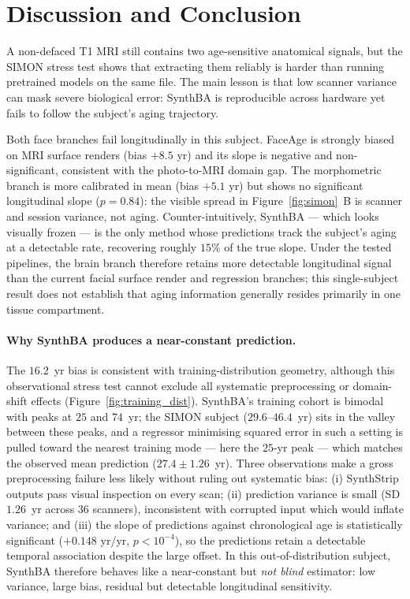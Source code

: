 \documentclass[11pt]{article}
\begin{document}
\section{Discussion and Conclusion}

A non-defaced T1 MRI still contains two age-sensitive anatomical signals,
but the SIMON stress test shows that extracting them reliably is harder than
running pretrained models on the same file.  The main lesson is that low
scanner variance can mask severe biological error: SynthBA is reproducible
across hardware yet fails to follow the subject's aging trajectory.

Both face branches fail longitudinally in this subject.  FaceAge is
strongly biased on MRI surface renders (bias $+8.5$ yr) and its slope is
negative and non-significant, consistent with the photo-to-MRI domain
gap.  The morphometric branch is more calibrated in mean (bias $+5.1$
yr) but shows no significant longitudinal slope ($p{=}0.84$): the
visible spread in Figure~\ref{fig:simon}~B is scanner and session
variance, not aging.  Counter-intuitively, SynthBA --- which looks
visually frozen --- is the only method whose predictions track the
subject's aging at a detectable rate, recovering roughly $15\%$ of the
true slope. Under the tested pipelines, the brain branch therefore retains
more detectable longitudinal signal than the current facial surface render
and regression branches; this single-subject result does not establish that
aging information generally resides primarily in one tissue compartment.

\paragraph{Why SynthBA produces a near-constant prediction.}
The $16.2$~yr bias is consistent with training-distribution geometry, although
this observational stress test cannot exclude all systematic preprocessing
or domain-shift effects (Figure~\ref{fig:training_dist}).  SynthBA's
training cohort is bimodal with peaks at $25$ and $74$~yr; the SIMON
subject ($29.6$--$46.4$~yr) sits in the valley between these peaks, and a
regressor minimising squared error in such a setting is pulled toward the
nearest training mode --- here the $25$-yr peak --- which matches the
observed mean prediction ($27.4 \pm 1.26$~yr). Three observations make a gross
preprocessing failure less likely without ruling out systematic bias:
(i) SynthStrip outputs pass visual inspection on every scan;
(ii) prediction variance is small (SD $1.26$~yr across $36$ scanners),
inconsistent with corrupted input which would inflate variance; and
(iii) the slope of predictions against chronological age is statistically
significant ($+0.148$ yr/yr, $p<10^{-4}$), so the predictions retain a
detectable temporal association despite the large offset.
In this out-of-distribution subject, SynthBA therefore behaves
like a near-constant but \emph{not blind} estimator: low variance, large
bias, residual but detectable longitudinal sensitivity.
\end{document}
